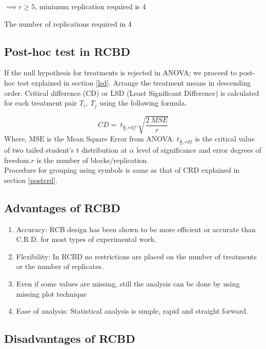 \documentclass[
]{book}
\begin{document}
\(\implies r \geq 5\), minimum replication required is 4

The number of replications required in 4

\hypertarget{post-hoc-test-in-rcbd}{%
\subsection{Post-hoc test in RCBD}\label{post-hoc-test-in-rcbd}}

If the null hypothesis for treatments is rejected in ANOVA; we proceed to post-hoc test explained in section \ref{lsd}. Arrange the treatment means in descending order. Critical difference (CD) or LSD (Least Significant Difference) is calculated for each treatment pair \(T_{i},\ T_{j}\) using the following formula.

\[CD = \ t_{\frac{\alpha}{2},edf}.\sqrt{\frac{2\ MSE}{r}}\]
Where, \(\text{MSE}\) is the Mean Square Error from ANOVA.
\(t_{\frac{\alpha}{2},edf}\) is the critical value of two tailed student's t distribution at \(\alpha\) level of significance and error degrees of
freedom.\(r\) is the number of blocks/replication.\\
Procedure for grouping using symbols is same as that of CRD explained in section \ref{postcrd}.

\hypertarget{advantages-of-rcbd}{%
\subsection{Advantages of RCBD}\label{advantages-of-rcbd}}

\begin{enumerate}
\def\labelenumi{\arabic{enumi}.}
\item
  Accuracy: RCB design has been shown to be more efficient or accurate than C.R.D. for most types of experimental work.
\item
  Flexibility: In RCBD no restrictions are placed on the number of treatments or
  the number of replicates.
\item
  Even if some values are missing, still the analysis can be done by using missing plot
  technique
\item
  Ease of analysis: Statistical analysis is simple, rapid and straight forward.
\end{enumerate}

\hypertarget{disadvantages-of-rcbd}{%
\subsection{Disadvantages of RCBD}\label{disadvantages-of-rcbd}}
\end{document}

